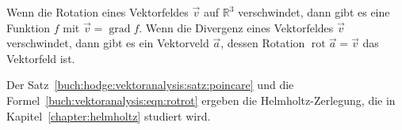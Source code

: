 \begin{satz}
\label{buch:hodge:vektoranalysis:satz:poincare}
Wenn die Rotation eines Vektorfeldes $\vec{v}$ auf $\mathbb{R}^3$
verschwindet, dann gibt es eine Funktion $f$ mit
$\vec{v}=\operatorname{grad}f$.
Wenn die Divergenz eines Vektorfeldes $\vec{v}$ verschwindet,
dann gibt es ein Vektorveld $\vec{a}$, dessen Rotation
$\operatorname{rot}\vec{a}=\vec{v}$ das Vektorfeld ist.
\end{satz}

Der Satz~\ref{buch:hodge:vektoranalysis:satz:poincare}
und die Formel~\eqref{buch:vektoranalysis:eqn:rotrot}
ergeben die Helmholtz-Zerlegung, die in Kapitel~\ref{chapter:helmholtz}
studiert wird.


